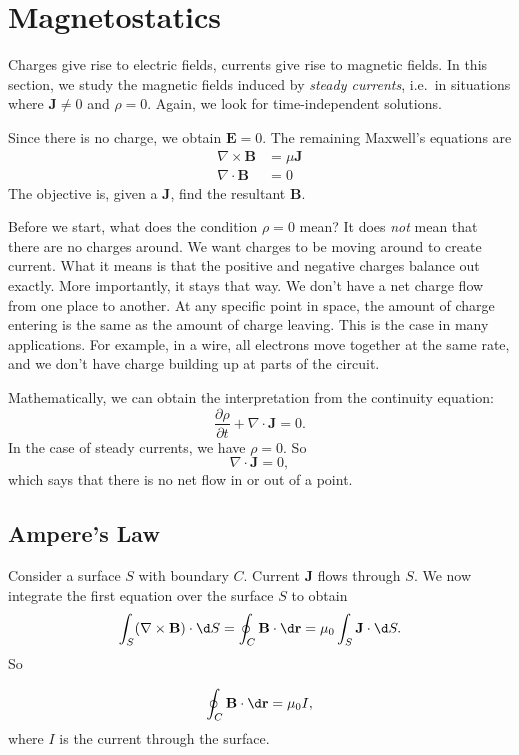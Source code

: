 \documentclass[a4paper]{article}
\begin{document}
\section{Magnetostatics}
Charges give rise to electric fields, currents give rise to magnetic fields. In this section, we study the magnetic fields induced by \emph{steady currents}, i.e.\ in situations where $\mathbf{J}\not= 0$ and $\rho = 0$. Again, we look for time-independent solutions.

Since there is no charge, we obtain $\mathbf{E} = 0$. The remaining Maxwell's equations are
\begin{align*}
  \nabla \times \mathbf{B} &= \mu \mathbf{J}\\
  \nabla\cdot \mathbf{B} &= 0
\end{align*}
The objective is, given a $\mathbf{J}$, find the resultant $\mathbf{B}$.

Before we start, what does the condition $\rho = 0$ mean? It does \emph{not} mean that there are no charges around. We want charges to be moving around to create current. What it means is that the positive and negative charges balance out exactly. More importantly, it stays that way. We don't have a net charge flow from one place to another. At any specific point in space, the amount of charge entering is the same as the amount of charge leaving. This is the case in many applications. For example, in a wire, all electrons move together at the same rate, and we don't have charge building up at parts of the circuit.

Mathematically, we can obtain the interpretation from the continuity equation:
\[
  \frac{\partial\rho}{\partial t} + \nabla \cdot \mathbf{J} = 0.
\]
In the case of steady currents, we have $\rho = 0$. So
\[
  \nabla\cdot \mathbf{J} = 0,
\]
which says that there is no net flow in or out of a point.
\subsection{Ampere's Law}
Consider a surface $S$ with boundary $C$. Current $\mathbf{J}$ flows through $S$. We now integrate the first equation over the surface $S$ to obtain
\[
  \int_S (\nabla\times \mathbf{B})\cdot \d S = \oint_C \mathbf{B}\cdot \d \mathbf{r} = \mu_0 \int_S \mathbf{J}\cdot \d S.
\]
So
\begin{law}
  \[
    \oint_C \mathbf{B}\cdot \d \mathbf{r} = \mu_0 I,
  \]
  where $I$ is the current through the surface.
\end{law}
\end{document}
